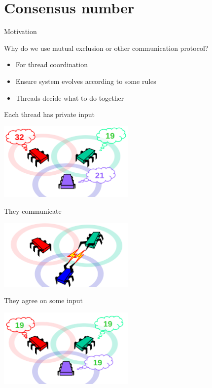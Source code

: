 \section{Consensus number}
\showTOC

\begin{frame}{Motivation}

Why do we use mutual exclusion or other communication protocol?

\pause

\begin{itemize}
  \item For thread coordination
  \pause
  \item Ensure system evolves according to some rules
  \pause
  \item Threads decide what to do together
\end{itemize}

\end{frame}


\begin{frame}{Each thread has private input}
\begin{center}
  \includegraphics[width=0.5\textwidth]{./pics/consensus/cons1.png}
\end{center}
\end{frame}

\begin{frame}[noframenumbering]{They communicate}

\begin{center}
  \includegraphics[width=0.5\textwidth]{./pics/consensus/cons2.png}
\end{center}

\end{frame}

\begin{frame}[noframenumbering]{They agree on some input}

\begin{center}
  \includegraphics[width=0.5\textwidth]{./pics/consensus/cons3.png}
\end{center}
\end{frame}



